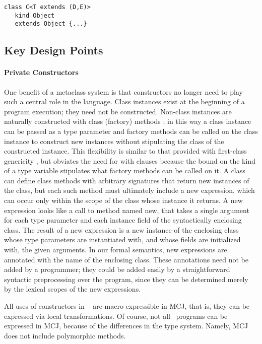 \documentclass{acm-sigplan}
\begin{document}
\begin{verbatim}
class C<T extends (D,E)>
   kind Object
   extends Object {...}
\end{verbatim}


\subsection{Key Design Points}

\paragraph{Private Constructors}
\label{privconst}

One benefit of a metaclass system is that constructors no longer need
to play such a central role in the language. Class instances exist at
the beginning of a program execution; they need not be
constructed. Non-class instances are naturally constructed with class
(factory) methods \cite{GOF}; in this way a class instance can be
passed as a type parameter and factory methods can be called on the
class instance to construct new instances without stipulating the
class of the constructed instance. This flexibility is similar to that
provided with first-class genericity \cite{NextGen, MixGen}, but
obviates the need for {\txt with} clauses because the bound on the
kind of a type variable stipulates what factory methods can be called
on it.  A class can define class methods with arbitrary signatures
that return new instances of the class, but each such method must
ultimately include a {\txt new} expression, which can occur only
within the scope of the class whose instance it returns. A {\txt new}
expression looks like a call to method named {\txt new}, that takes a
single argument for each type parameter and each instance field of the
syntactically enclosing class. The result of a {\txt new} expression
is a new instance of the enclosing class whose type parameters are
instantiated with, and whose fields are initialized with, the given
arguments. In our formal semantics, {\txt new} expressions are
annotated with the name of the enclosing class. These annotations need
not be added by a programmer; they could be added easily by a
straightforward syntactic preprocessing over the program, since they
can be determined merely by the lexical scopes of the {\txt new}
expressions.

All uses of constructors in \FGJ\ \cite{FJ} are macro-expressible
\cite{FellExpress} in MCJ, that is, they can be expressed via local
transformations.  Of course, not all \FGJ\ programs can be expressed
in MCJ, because of the differences in the type system. Namely, MCJ
does not include polymorphic methods.
\end{document}
